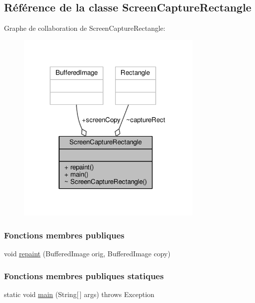 \hypertarget{classScreenCaptureRectangle}{}\subsection{Référence de la classe Screen\+Capture\+Rectangle}
\label{classScreenCaptureRectangle}


Graphe de collaboration de Screen\+Capture\+Rectangle\+:\nopagebreak
\begin{figure}[H]
\begin{center}
\leavevmode
\includegraphics[width=255pt]{classScreenCaptureRectangle__coll__graph}
\end{center}
\end{figure}
\subsubsection*{Fonctions membres publiques}
\begin{DoxyCompactItemize}
\item 
void \hyperlink{classScreenCaptureRectangle_a2e065ce458964b134232f20e947d59aa}{repaint} (Buffered\+Image orig, Buffered\+Image copy)
\end{DoxyCompactItemize}
\subsubsection*{Fonctions membres publiques statiques}
\begin{DoxyCompactItemize}
\item 
static void \hyperlink{classScreenCaptureRectangle_ae7844603a26e5b4f73a3e023526c1a7e}{main} (String\mbox{[}$\,$\mbox{]} args)  throws Exception 
\end{DoxyCompactItemize}
